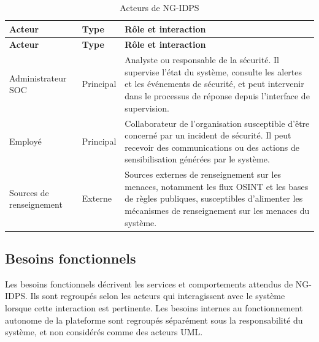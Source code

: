 
\renewcommand{\arraystretch}{1.5}
\small
\begin{xltabular}{\textwidth}{|l|l|>{\raggedright\arraybackslash}X|}

\caption{Acteurs de NG-IDPS}
\label{tab:acteurs} \\

\hline
{}
\textbf{Acteur} & \textbf{Type} & \textbf{Rôle et interaction} \\ \hline
\endfirsthead

\hline
{}
\textbf{Acteur} & \textbf{Type} & \textbf{Rôle et interaction} \\ \hline
\endhead

Administrateur SOC & Principal &
Analyste ou responsable de la sécurité. Il supervise l'état du système, consulte les alertes et les événements de sécurité, et peut intervenir dans le processus de réponse depuis l'interface de supervision. \\
\hline

Employé & Principal &
Collaborateur de l'organisation susceptible d'être concerné par un incident de sécurité. Il peut recevoir des communications ou des actions de sensibilisation générées par le système. \\
\hline

Sources de renseignement & Externe &
Sources externes de renseignement sur les menaces, notamment les flux OSINT et les bases de règles publiques, susceptibles d'alimenter les mécanismes de renseignement sur les menaces du système. \\
\hline

\end{xltabular}

\subsection{Besoins fonctionnels}
\label{sec:bf}
Les besoins fonctionnels décrivent les services et comportements attendus de NG-IDPS. Ils sont regroupés selon les acteurs qui interagissent avec le système lorsque cette interaction est pertinente. Les besoins internes au fonctionnement autonome de la plateforme sont regroupés séparément sous la responsabilité du système, et non considérés comme des acteurs UML.

